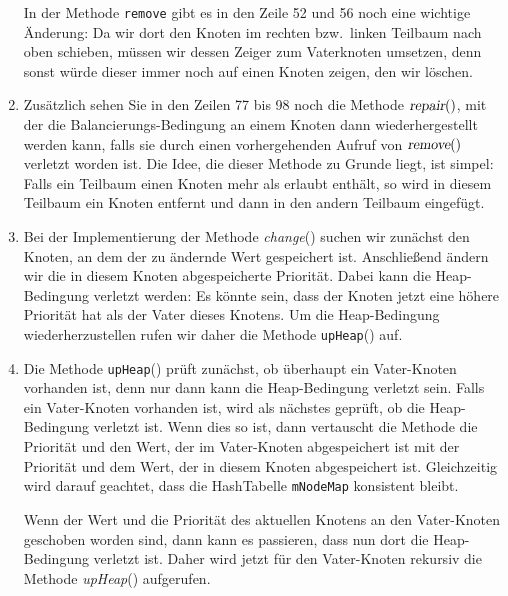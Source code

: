\begin{enumerate}
      In der Methode \texttt{remove} gibt es in den Zeile 52 und 56 noch eine wichtige 
      \"Anderung: Da wir dort den Knoten im rechten bzw.~linken Teilbaum nach oben schieben,
      m\"ussen wir dessen Zeiger zum Vaterknoten umsetzen, denn sonst w\"urde dieser immer noch
      auf einen Knoten zeigen, den wir l\"oschen.
\item Zus\"atzlich sehen Sie in den Zeilen 77 bis 98 noch die Methode $\textsl{repair}()$,
      mit der die Balan\-cierungs-Bedingung an einem Knoten dann wiederhergestellt werden kann, 
      falls sie durch einen vorhergehenden Aufruf von $\textsl{remove}()$ verletzt worden ist.
      Die Idee, die dieser Methode zu Grunde liegt, ist simpel:  Falls ein Teilbaum einen Knoten
      mehr als erlaubt enth\"alt, so wird in diesem Teilbaum ein Knoten entfernt und dann in den
      andern Teilbaum eingef\"ugt.
\item Bei der Implementierung der Methode \textsl{change}() suchen wir zun\"achst
      den Knoten, an dem der zu \"andernde Wert gespeichert ist.  Anschlie{\ss}end
      \"andern wir die in diesem Knoten abgespeicherte Priorit\"at.  Dabei kann die
      Heap-Bedingung verletzt werden: Es k\"onnte sein, dass der Knoten jetzt eine h\"ohere
      Priorit\"at hat als der Vater dieses Knotens.  Um die Heap-Bedingung
      wiederherzustellen rufen wir daher die Methode \texttt{upHeap}() auf.
\item Die Methode \texttt{upHeap}() pr\"uft zun\"achst, ob \"uberhaupt ein Vater-Knoten
      vorhanden ist, denn nur dann kann die Heap-Bedingung verletzt sein.
      Falls ein Vater-Knoten vorhanden ist, wird als n\"achstes gepr\"uft, ob die 
      Heap-Bedingung verletzt ist.  Wenn dies so ist,
      dann vertauscht die Methode die Priorit\"at und den Wert, der im Vater-Knoten
      abgespeichert ist mit der Priorit\"at und dem Wert, der in diesem Knoten 
      abgespeichert ist.  Gleichzeitig wird darauf geachtet, dass die HashTabelle
      \texttt{mNodeMap} konsistent bleibt.
      
      Wenn der Wert und die Priorit\"at des aktuellen Knotens an den Vater-Knoten
      geschoben  worden sind, dann kann es passieren, dass nun dort die Heap-Bedingung
      verletzt ist.  Daher wird jetzt f\"ur den Vater-Knoten rekursiv die Methode
      \textsl{upHeap}() aufgerufen.
\end{enumerate}


